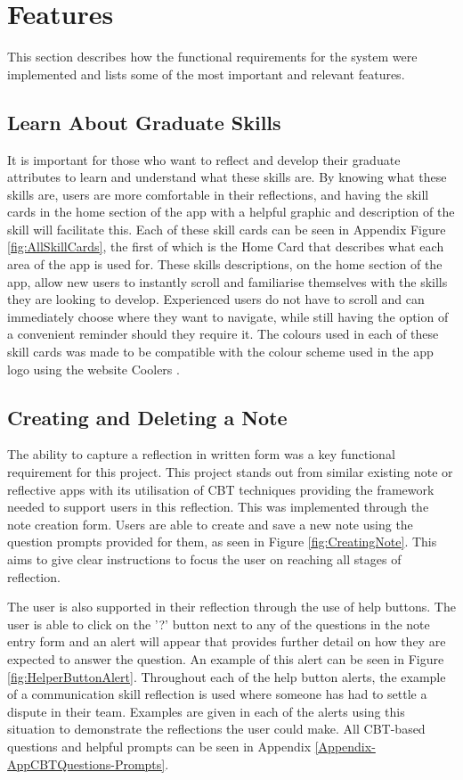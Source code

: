 \documentclass{l4proj}
\begin{document}
\section{Features}

This section describes how the functional requirements for the system were implemented and lists some of the most important and relevant features. 

\subsection{Learn About Graduate Skills}

It is important for those who want to reflect and develop their graduate attributes to learn and understand what these skills are. By knowing what these skills are, users are more comfortable in their reflections, and having the skill cards in the home section of the app with a helpful graphic and description of the skill will facilitate this. Each of these skill cards can be seen in Appendix Figure \ref{fig:AllSkillCards}, the first of which is the Home Card that describes what each area of the app is used for. These skills descriptions, on the home section of the app, allow new users to instantly scroll and familiarise themselves with the skills they are looking to develop. Experienced users do not have to scroll and can immediately choose where they want to navigate, while still having the option of a convenient reminder should they require it. The colours used in each of these skill cards was made to be compatible with the colour scheme used in the app logo using the website Coolers \citep{coolersco_coolors_2021}.

\subsection{Creating and Deleting a Note}

The ability to capture a reflection in written form was a key functional requirement for this project. This project stands out from similar existing note or reflective apps with its utilisation of CBT techniques providing the framework needed to support users in this reflection. This was implemented through the note creation form. Users are able to create and save a new note using the question prompts provided for them, as seen in Figure \ref{fig:CreatingNote}. This aims to give clear instructions to focus the user on reaching all stages of reflection. 

The user is also supported in their reflection through the use of help buttons. The user is able to click on the '?' button next to any of the questions in the note entry form and an alert will appear that provides further detail on how they are expected to answer the question. An example of this alert can be seen in Figure \ref{fig:HelperButtonAlert}. Throughout each of the help button alerts, the example of a communication skill reflection is used where someone has had to settle a dispute in their team. Examples are given in each of the alerts using this situation to demonstrate the reflections the user could make. All CBT-based questions and helpful prompts can be seen in Appendix \ref{Appendix-AppCBTQuestions-Prompts}.
\end{document}
